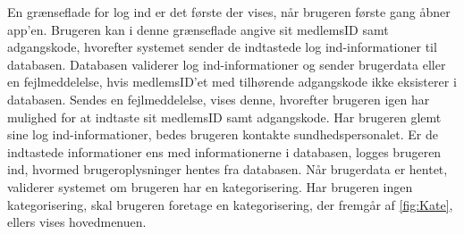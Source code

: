 \noindent
En grænseflade for log ind er det første der vises, når brugeren første gang åbner app'en. Brugeren kan i denne grænseflade angive sit medlemsID samt adgangskode, hvorefter systemet sender de indtastede log ind-informationer til databasen. Databasen validerer log ind-informationer og sender brugerdata eller en fejlmeddelelse, hvis medlemsID'et med tilhørende adgangskode ikke eksisterer i databasen. 
Sendes en fejlmeddelelse, vises denne, hvorefter brugeren igen har mulighed for at indtaste sit medlemsID samt adgangskode. Har brugeren glemt sine log ind-informationer, bedes brugeren kontakte sundhedspersonalet. Er de indtastede informationer ens med informationerne i databasen, logges brugeren ind, hvormed brugeroplysninger hentes fra databasen.
Når brugerdata er hentet, validerer systemet om brugeren har en kategorisering. Har brugeren ingen kategorisering, skal brugeren foretage en kategorisering, der fremgår af \autoref{fig:Kate}, ellers vises hovedmenuen.




   


